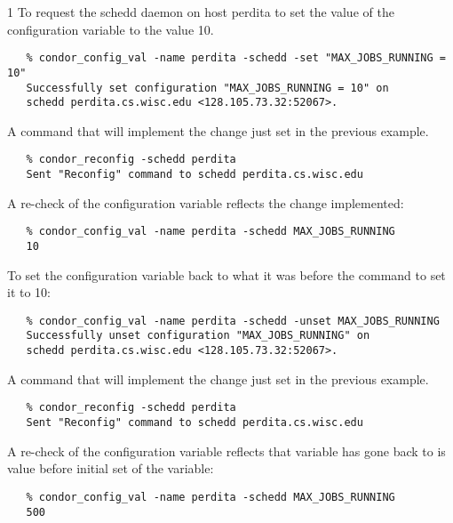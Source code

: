 \begin{ManPage}{\label{man-condor-config-val}}{1}
To request the schedd daemon on host perdita
to set the value of the 
configuration variable
to the value 10.
\begin{verbatim}
   % condor_config_val -name perdita -schedd -set "MAX_JOBS_RUNNING = 10"
   Successfully set configuration "MAX_JOBS_RUNNING = 10" on 
   schedd perdita.cs.wisc.edu <128.105.73.32:52067>.
\end{verbatim}

A command that will implement the change just set in the previous
example.
\begin{verbatim}
   % condor_reconfig -schedd perdita
   Sent "Reconfig" command to schedd perdita.cs.wisc.edu
\end{verbatim}

A re-check of the configuration variable reflects the change implemented:
\begin{verbatim}
   % condor_config_val -name perdita -schedd MAX_JOBS_RUNNING
   10
\end{verbatim}

To set the configuration variable 
back to what it was before the command to set it to 10:
\begin{verbatim}
   % condor_config_val -name perdita -schedd -unset MAX_JOBS_RUNNING
   Successfully unset configuration "MAX_JOBS_RUNNING" on 
   schedd perdita.cs.wisc.edu <128.105.73.32:52067>.
\end{verbatim}

A command that will implement the change just set in the previous
example.
\begin{verbatim}
   % condor_reconfig -schedd perdita
   Sent "Reconfig" command to schedd perdita.cs.wisc.edu
\end{verbatim}

A re-check of the configuration variable reflects that variable
has gone back to is value before initial set of the variable:
\begin{verbatim}
   % condor_config_val -name perdita -schedd MAX_JOBS_RUNNING
   500
\end{verbatim}

\end{ManPage}
